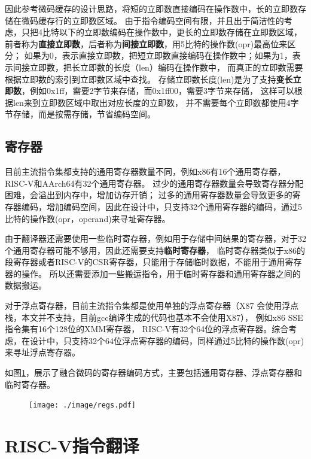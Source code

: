 因此参考微码缓存的设计思路，将短的立即数直接编码在操作数中，长的立即数存储在微码缓存行的立即数区域。
由于指令编码空间有限，并且出于简洁性的考虑，只把4比特以下的立即数编码在操作数中，更长的立即数存储在立即数区域，
前者称为\textbf{直接立即数}，后者称为\textbf{间接立即数}，用5比特的操作数(opr)最高位来区分；
如果为0，表示直接立即数，把短立即数直接编码在操作数中；如果为1，表示间接立即数，把长立即数的长度（len）编码在操作数中，
而真正的立即数需要根据立即数的索引到立即数区域中查找。
存储立即数长度(len)是为了支持\textbf{变长立即数}，例如0x1ff，需要2字节来存储，而0x1ff00，需要3字节来存储，
这样可以根据len来到立即数区域中取出对应长度的立即数，
并不需要每个立即数都使用4字节存储，而是按需存储，节省编码空间。


\subsection{寄存器}

目前主流指令集都支持的通用寄存器数量不同，例如x86有16个通用寄存器，RISC-V和AArch64有32个通用寄存器。
过少的通用寄存器数量会导致寄存器分配困难，会溢出到内存中，增加访存开销；
过多的通用寄存器数量会导致更多的寄存器编码，增加编码空间，因此在设计中，只支持32个通用寄存器的编码，通过5比特的操作数(opr，operand)来寻址寄存器。

由于翻译器还需要使用一些临时寄存器，例如用于存储中间结果的寄存器，对于32个通用寄存器可能不够用，因此还需要支持\textbf{临时寄存器}，
临时寄存器类似于x86的段寄存器或者RISC-V的CSR寄存器，只能用于存储临时数据，不能用于通用寄存器的操作。
所以还需要添加一些搬运指令，用于临时寄存器和通用寄存器之间的数据搬运。

对于浮点寄存器，目前主流指令集都是使用单独的浮点寄存器（X87 会使用浮点栈，本文并不支持，目前gcc编译生成的代码也基本不会使用X87），
例如x86 SSE指令集有16个128位的XMM寄存器，
RISC-V有32个64位的浮点寄存器。综合考虑，在设计中，只支持32个64位浮点寄存器的编码，同样通过5比特的操作数(opr)来寻址浮点寄存器。

如图\ref{img:regs}，展示了融合微码的寄存器编码方式，主要包括通用寄存器、浮点寄存器和临时寄存器。

\begin{figure}[h]
  \centering
  \texttt{[image: ./image/regs.pdf]}
  \label{img:regs}
\end{figure}



\section{RISC-V指令翻译}

